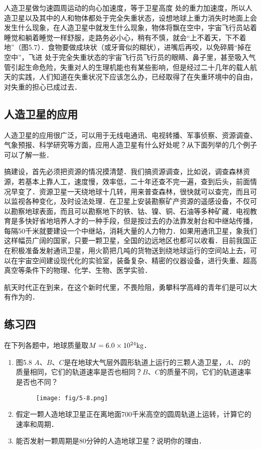 人造卫星做匀速圆周运动的向心加速度，等于卫星高度
处的重力加速度，所以人造卫星以及其中的人和物体都处于完全失重状态，设想地球上重力消失时地面上会发生什么现象，在人造卫星中就发生什么现象，物体将飘在空中，宇宙飞行员站着睡觉和躺着睡觉一样舒服，走路务必小心，稍有不慎，就会“上不着天，下不着地”（图5.7）．食物要做成块状（或牙膏似的糊状），进嘴后再咬，以免碎屑“掉在空中”，飞进
处于完全失重状态的宇宙飞行员飞行员的眼睛、鼻子里，甚至吸入气管引起生命危险，失重对人的生理机能也有某些影响，但是经过二十几年的载人航天的实践，人们知道在失重状况下应该怎么办，已经取得了在失重环境中的自由，对失重的担心已成过去．

\subsection{人造卫星的应用}

人造卫星的应用很广泛，可以用于无线电通讯、电视转播、军事侦察、资源调查、气象预报、科学研究等方面，应用人造卫星有什么好处呢？从下面列举的几个例子可以了解一些．

搞建设，首先必须把资源的情况摸清楚．我们搞资源调查，比如说，调查森林资源，若基本上靠人工，速度慢，效率低，二十年还查不完一遍，查到后头，前面情况早变了．资源卫星一天绕地球十几转，用来普查森林，很快就可以查完，而且可
以监视各种变化，及时设法处理．在卫星上安装勘察矿产资源的遥感设备，不仅可以勘察地球表面，而且可以勘察地下的铁、钴、镍、铜、石油等多种矿藏．电视教育是多快好省地培养人才的一种手段，但是按过去的办法靠发射台和中继站传播，每隔50千米就要建设一个中继站，消耗大量的人力物力．如果用通讯卫星，象我们这样幅员广阔的国家，只要一颗卫星，全国的边远地区也都可以收看．目前我国正在积极准备发射通讯卫星，用火箭把几吨的货物送到绕地球运行的空间站上去，可以在宇宙空间建设现代化的实验室，装备复杂、精密的仪器设备，进行失重、超高真空等条件下的物理、化学、生物、医学实验．

航天时代正在到来，在这个新时代里，不畏险阻，勇攀科学高峰的青年们是可以大有作为的．	
	
\subsection*{练习四}

在下列各题中，地球质量取$M=6.0\times 10^{24}{\rm kg}$．
\begin{enumerate}
	\item 图5.8 $A$、$B$、$C$是在地球大气层外圆形轨道上运行的三颗人造卫星，$A$、$B$的质量相同，它们的轨道速率是否也相同？$B$、$C$的质量不同，它们的轨道速率是否也不同？

\begin{figure}[htp]
\centering\texttt{[image: fig/5-8.png]}
\caption{}
\end{figure}

\item  假定一颗人造地球卫星正在离地面700千米高空的圆周轨道上运转，计算它的速率和周期．
\item 能否发射一颗周期是80分钟的人造地球卫星？说明你的理由．
\end{enumerate}
	
